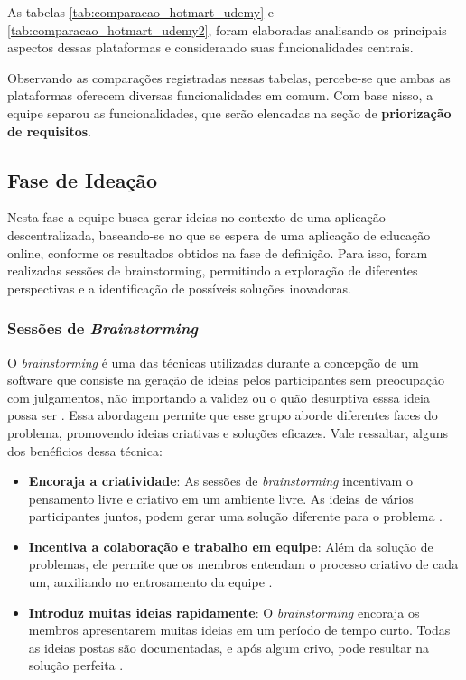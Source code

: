         As tabelas \ref{tab:comparacao_hotmart_udemy} e \ref{tab:comparacao_hotmart_udemy2}, foram elaboradas analisando os principais aspectos dessas plataformas e considerando suas funcionalidades centrais.

        Observando as comparações registradas nessas tabelas, percebe-se que ambas as plataformas oferecem diversas funcionalidades em comum. Com base nisso, a equipe separou as funcionalidades, que serão elencadas na seção de \textbf{priorização de requisitos}.

    \subsection{Fase de Ideação}
    Nesta fase a equipe busca gerar ideias no contexto de uma aplicação descentralizada, baseando-se no que se espera de uma aplicação de educação online, conforme os resultados obtidos na fase de definição. Para isso, foram realizadas sessões de brainstorming, permitindo a exploração de diferentes perspectivas e a identificação de possíveis soluções inovadoras.

        \subsubsection{Sessões de \textit{Brainstorming}}
        \label{brainstorming}
        O \textit{brainstorming} é uma das técnicas utilizadas durante a concepção de um software que consiste na geração de ideias pelos participantes sem preocupação com julgamentos, não importando a validez ou o quão desurptiva esssa ideia possa ser \cite{osborn1953}. Essa abordagem permite que esse grupo aborde diferentes faces do problema, promovendo ideias criativas e soluções eficazes. Vale ressaltar, alguns dos benéficios dessa técnica:

        \begin{itemize}
            \item \textbf{Encoraja a criatividade}: As sessões de \textit{brainstorming} incentivam o pensamento livre e criativo em um ambiente livre. As ideias de vários participantes juntos, podem gerar uma solução diferente para o problema \cite{miro2025}.
            \item \textbf{Incentiva a colaboração e trabalho em equipe}: Além da solução de problemas, ele permite que os membros entendam o processo criativo de cada um, auxiliando no entrosamento da equipe \cite{miro2025}.
            \item \textbf{Introduz muitas ideias rapidamente}: O \textit{brainstorming} encoraja os membros apresentarem muitas ideias em um período de tempo curto. Todas as ideias postas são documentadas, e após algum crivo, pode resultar na solução perfeita \cite{miro2025}.
        \end{itemize}

